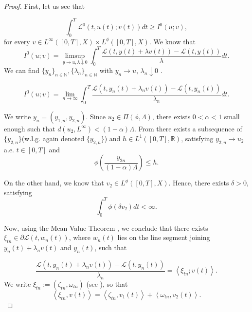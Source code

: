 \documentclass[twoside]{article}
\theoremstyle{definition}
\theoremstyle{plain}
\theoremstyle{remark}
\begin{document}
\begin{proof}
First, let us see that

\begin{equation}\label{ineteodif5}
 \int_0^T{\mathcal{L}^0(t,u(t);v(t))dt} \geq I^0(u; v),
\end{equation}
for every $v  \in L^\infty([0,T],X)\times L^\phi([0,T],X).$
We know that 
\[ I^0(u; v)= \limsup\limits_{y\rightarrow u, \lambda \downarrow 0} \int_0^T \frac{ \mathcal{L} (t, y(t)+ \lambda v(t))- \mathcal{L}(t,y(t))}{\lambda} dt.\]
We can find $\{y_n\}_{n\in \mathbb{N}},\{\lambda_n\}_{n\in \mathbb{N}}$
with $y_n\to u$, $\lambda_n \downarrow 0$ . 

\begin{equation}\label{limsup}
   I^0(u; v)= \lim_{n\rightarrow \infty} \int_0^T \frac{ \mathcal{L} (t,y_n(t)+ \lambda_n v(t))- \mathcal{L}(t,y_n(t))}{\lambda_n} dt.
\end{equation}

We write $y_n=(y_{1,n},y_{2,n})$. Since $u_2\in \Pi(\phi, \Lambda)$, there exists $0<\alpha<1$ small enough such that $d(u_2, L^\infty)<(1-\alpha)\Lambda$. From \cite[Lemma 4.7]{Mazzone2019} there exists a subsequence of $\{y_{2,n}\}$(w.l.g. again denoted  $\{y_{2,n}\}$) and $h \in L^1([0,T], \mathbb{R})$, satisfying $y_{2,n} \to u_2$ a.e. $t\in [0,T]$ and
\begin{equation}\label{ineaux1}
 \phi \left(\frac{y_{2n}}{(1-\alpha)\Lambda}\right)\leq h.
\end{equation}

On the other hand, we know that $v_2 \in L^\phi([0,T],X)$. Hence, there exists $\delta>0$, satisfying
\begin{equation}\label{ineaux2}
   \int_0^T \phi(\delta v_2)dt <\infty.
\end{equation}


Now,  using the Mean Value Theorem \cite[Th. 10.17]{clarke2013functional}, we conclude that there exists $\xi_{tn} \in \partial \mathcal{L}(t,w_n(t))$, where
 $w_n(t)$ lies on the line segment joining $y_n(t)+\lambda_n v(t)$ and $y_n(t)$,  such that


 \begin{equation}\label{ineteodif4}
  \frac{\mathcal{L}(t,y_n(t)+\lambda_n v(t))-\mathcal{L}(t,y_n(t))}{\lambda_n} = \left< \xi_{tn} ; v(t)\right>.
 \end{equation}
We write $\xi_{tn}:=(\zeta_{tn},\omega_{tn})$ (see  \cite[Prop. 2.3.15]{clarke1990optimization} ), so that
\begin{equation}\label{ineteodif0}
 \left< \xi_{tn}, v(t)\right>=\left<\zeta_{tn},v_1(t)\right>+\left<\omega_{tn},v_2(t)\right>.
\end{equation}




\end{proof}
\end{document}
